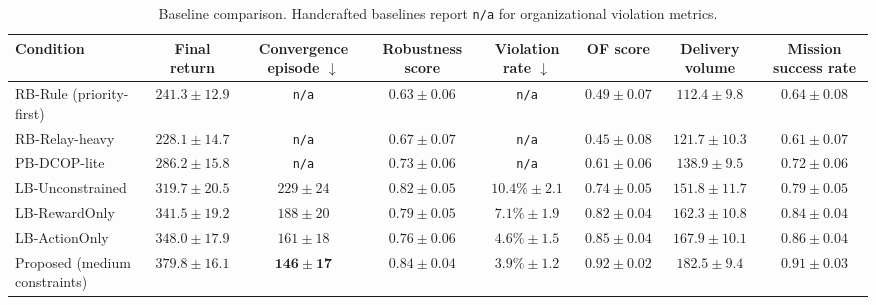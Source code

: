 \documentclass[sigconf]{aamas}
\begin{document}
\begin{table}[h!]
    \caption{Baseline comparison. Handcrafted baselines report \texttt{n/a} for organizational violation metrics.}
    \label{tab:results-baselines}
    \centering
    \scriptsize
    \begin{tabularx}{\textwidth}{p{3.5cm} c c c c c c c}
        \toprule
        Condition                     & Final return              & Convergence episode $\downarrow$ & Robustness score         & Violation rate $\downarrow$ & OF score                 & Delivery volume          & Mission success rate     \\
        \midrule
        RB-Rule (priority-first)      & $241.3 \pm 12.9$          & \texttt{n/a}                     & $0.63 \pm 0.06$          & \texttt{n/a}                & $0.49 \pm 0.07$          & $112.4 \pm 9.8$          & $0.64 \pm 0.08$          \\
        RB-Relay-heavy                & $228.1 \pm 14.7$          & \texttt{n/a}                     & $0.67 \pm 0.07$          & \texttt{n/a}                & $0.45 \pm 0.08$          & $121.7 \pm 10.3$         & $0.61 \pm 0.07$          \\
        PB-DCOP-lite                  & $286.2 \pm 15.8$          & \texttt{n/a}                     & $0.73 \pm 0.06$          & \texttt{n/a}                & $0.61 \pm 0.06$          & $138.9 \pm 9.5$          & $0.72 \pm 0.06$          \\
        LB-Unconstrained              & $319.7 \pm 20.5$          & $229 \pm 24$                     & $0.82 \pm 0.05$          & $10.4\% \pm 2.1$            & $0.74 \pm 0.05$          & $151.8 \pm 11.7$         & $0.79 \pm 0.05$          \\
        LB-RewardOnly                 & $341.5 \pm 19.2$          & $188 \pm 20$                     & $0.79 \pm 0.05$          & $7.1\% \pm 1.9$             & $0.82 \pm 0.04$          & $162.3 \pm 10.8$         & $0.84 \pm 0.04$          \\
        LB-ActionOnly                 & $348.0 \pm 17.9$          & $161 \pm 18$                     & $0.76 \pm 0.06$          & $4.6\% \pm 1.5$             & $0.85 \pm 0.04$          & $167.9 \pm 10.1$         & $0.86 \pm 0.04$          \\
        Proposed (medium constraints) & $\mathbf{379.8 \pm 16.1}$ & $\mathbf{146 \pm 17}$            & $\mathbf{0.84 \pm 0.04}$ & $3.9\% \pm 1.2$             & $\mathbf{0.92 \pm 0.02}$ & $\mathbf{182.5 \pm 9.4}$ & $\mathbf{0.91 \pm 0.03}$ \\
        \bottomrule
    \end{tabularx}
\end{table}
\end{document}
